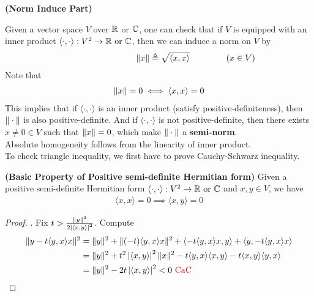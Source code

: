 \documentclass{report}
\begin{document}
\textbf{(Norm Induce Part)}
\begin{mdframed}
Given a vector space $V$ over $\mathbb{R}$ or  $\mathbb{C}$, one can check that if  $V$ is equipped with an inner product  $\langle \cdot,\cdot\rangle :V^2\rightarrow \mathbb{R}\text{ or }\mathbb{C}$, then we can induce a norm on $V$ by 
\begin{align*}
\hspace{3cm}\norm{x}\triangleq \sqrt{\langle x,x\rangle }\hspace{1.5cm}(x \in V)
\end{align*}
Note that 
\begin{align*}
\| x \|=0\iff \langle x,x\rangle =0 
\end{align*}
This implies that if $\langle \cdot,\cdot\rangle $ is an inner product (satisfy positive-definiteness), then $\| \cdot \|$ is also positive-definite. And if $\langle \cdot,\cdot\rangle $ is not positive-definite, then there exists  $x\neq 0\in V$ such that $\| x \|=0$, which make $\| \cdot \|$ a \textbf{semi-norm}.\\

Absolute homogeneity follows from the linearity of inner product.\\

To check triangle inequality, we first have to prove Cauchy-Schwarz inequality.
\end{mdframed}
\begin{theorem}
\label{BPoP}
\textbf{(Basic Property of Positive semi-definite Hermitian form)} Given a positive semi-definite Hermitian form $\langle \cdot,\cdot\rangle:V^2 \rightarrow \mathbb{R}\text{ or }\mathbb{C} $ and $x,y \in V$, we have 
\begin{align*}
\langle x,x\rangle =0 \implies \langle x,y\rangle =0
\end{align*}
\end{theorem}
\begin{proof}
. Fix $t> \frac{\| y \|^2 }{2\left|\langle x,y\rangle \right|^2}$. Compute 
\begin{align*}
\| y-t\langle y,x\rangle x \|^2 &= \| y \|^2 + \| (-t)\langle y,x\rangle x  \|^2  + \langle -t\langle y,x\rangle x,y \rangle + \langle y,-t\langle y,x\rangle x\rangle \\
&=\| y \|^2 + t^2 \left|\langle x,y\rangle \right|^2 \| x \|^2 -t \langle y,x\rangle \langle x,y\rangle - t \langle x,y\rangle \langle y,x\rangle  \\
&= \| y \|^2- 2t \left|\langle x,y\rangle \right|^2 <0 \text{ \textcolor{red}{CaC} }
\end{align*}
\end{proof}
\end{document}
